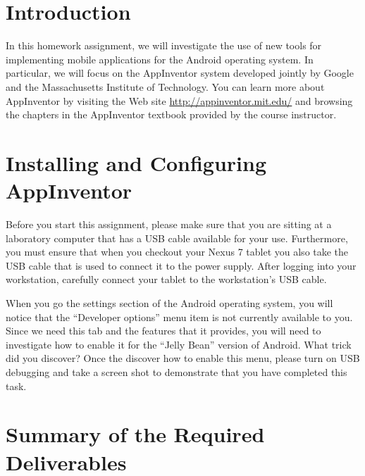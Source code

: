 	

\usepackage[compact]{titlesec}



\section*{Introduction}

In this homework assignment, we will investigate the use of new tools for implementing mobile applications for the
Android operating system.  In particular, we will focus on the AppInventor system developed jointly by Google and the
Massachusetts Institute of Technology.  You can learn more about AppInventor by visiting the Web site
\url{http://appinventor.mit.edu/} and browsing the chapters in the AppInventor textbook provided by the course
instructor.

\section*{Installing and Configuring AppInventor}

Before you start this assignment, please make sure that you are sitting at a laboratory computer that has a USB cable
available for your use.  Furthermore, you must ensure that when you checkout your Nexus 7 tablet you also take the USB
cable that is used to connect it to the power supply.  After logging into your workstation, carefully connect your 
tablet to the workstation's USB cable.

When you go the settings section of the Android operating system, you will notice that the ``Developer options'' menu
item is not currently available to you.  Since we need this tab and the features that it provides, you will need to investigate
how to enable it for the ``Jelly Bean'' version of Android.  What trick did you discover?  Once the discover how to
enable this menu, please turn on USB debugging and take a screen shot to demonstrate that you have completed this task.



\section*{Summary of the Required Deliverables}

